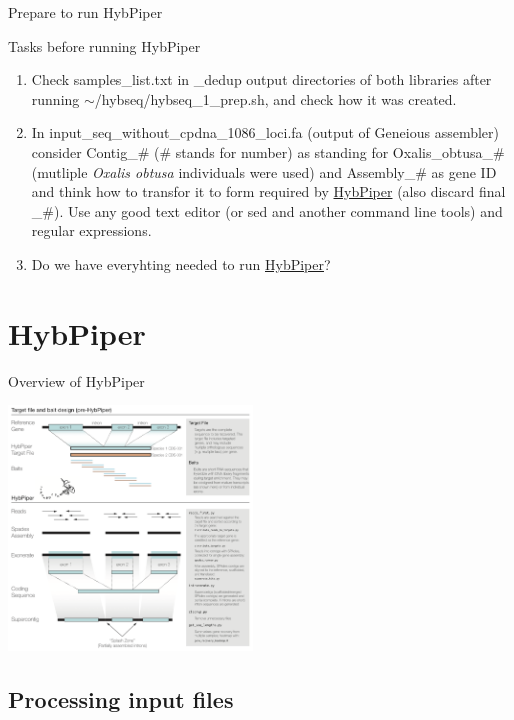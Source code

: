 \documentclass[compress, ucs, xelatex, 11pt, xcolor=x11names, aspectratio=169,
	hyperref={
		bookmarks=true,
		unicode=true,
		colorlinks=true,
		pdftitle={HybSeq course},
		plainpages=false,
		pdfauthor={Vojtech Zeisek},
		pdfsubject={Practical processing of HybSeq target enrichment sequencing data on computing grids like MetaCentrum},
		pdfcreator={XeLaTeX},
		pdfkeywords={BASH, command line, GNU, HybSeq, Linux, MetaCentrum, sequencing shell, target enrichment},
		linkcolor=Turquoise4, %
		anchorcolor=DodgerBlue4, %
		citecolor=DodgerBlue4, %
		filecolor=DodgerBlue4, %
		menucolor=Tan4, %
		urlcolor=DarkOliveGreen4, %
		pdftex},
	url={hyphens, lowtilde} %
	]{beamer}
\renewcommand{\texttt}[1]{\colorbox{Cornsilk2}{{\ttfamily #1}}}
\begin{document}
\begin{frame}{Prepare to run HybPiper}
	\begin{exampleblock}{Tasks before running HybPiper}
		\begin{enumerate}
			\item Check \texttt{samples\_list.txt} in \texttt{2\_dedup} output directories of both libraries after running \texttt{$\sim$/hybseq/hybseq\_1\_prep.sh}, and check how it was created.
			\item In \texttt{input\_seq\_without\_cpdna\_1086\_loci.fa} (output of Geneious assembler) consider \texttt{Contig\_\#} (\texttt{\#} stands for number) as standing for \texttt{Oxalis\_obtusa\_\#} (mutliple \textit{Oxalis obtusa} individuals were used) and \texttt{Assembly\_\#} as gene ID and think how to transfor it to form required by \href{https://github.com/mossmatters/HybPiper/wiki\#target-file}{HybPiper} (also discard final \texttt{\_\#}). Use any good text editor (or \texttt{sed} and another command line tools) and regular expressions.
			\item Do we have everyhting needed to run \href{https://github.com/mossmatters/HybPiper}{HybPiper}?
		\end{enumerate}
	\end{exampleblock}
\end{frame}

\section{HybPiper}

\begin{frame}{Overview of HybPiper}
	\begin{center}
		\includegraphics[height=6.5cm]{hybpiper.png}
	\end{center}
\end{frame}

\subsection{Processing input files}
\end{document}
